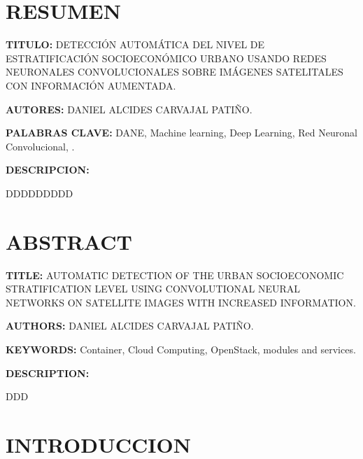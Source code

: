 	\setlength{\parskip}{\baselineskip} %


	\newpage\chapter*{RESUMEN}
    \textbf{TITULO:} DETECCIÓN AUTOMÁTICA DEL NIVEL DE ESTRATIFICACIÓN SOCIOECONÓMICO URBANO USANDO REDES NEURONALES CONVOLUCIONALES SOBRE IMÁGENES SATELITALES CON INFORMACIÓN AUMENTADA.
    
    \textbf{AUTORES:} DANIEL ALCIDES CARVAJAL PATIÑO.
    
    \textbf{PALABRAS CLAVE:} DANE, Machine learning, Deep Learning, Red Neuronal Convolucional, .	
    
    \textbf{DESCRIPCION:} 
    
    DDDDDDDDD
 
  
	\newpage\chapter*{ABSTRACT}
    \textbf{TITLE:} AUTOMATIC DETECTION OF THE URBAN SOCIOECONOMIC STRATIFICATION LEVEL USING CONVOLUTIONAL NEURAL NETWORKS ON SATELLITE IMAGES WITH INCREASED INFORMATION.
    
    \textbf{AUTHORS:} DANIEL ALCIDES CARVAJAL PATIÑO.
    
    \textbf{KEYWORDS:} Container, Cloud Computing, OpenStack, modules and services.
    
    \textbf{DESCRIPTION:} 
    
    DDD
    
\newpage\chapter*{INTRODUCCION}

